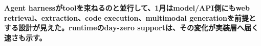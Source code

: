 \noindent\textbf{Agent harnessがtoolを束ねるのと並行して、1月はmodel/API側にもweb retrieval、extraction、code execution、multimodal generationを前提とする設計が見えた。runtimeのday-zero supportは、その変化が実装層へ届く速さも示す。}\autocite{src-6a97353d35a9,src-9156c37fb1c2,src-eac8dfbeb78c}

